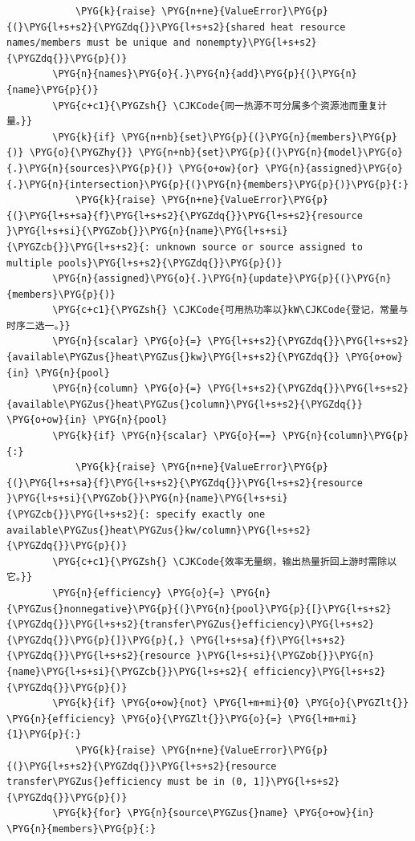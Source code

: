 \begin{Verbatim}
            \PYG{k}{raise} \PYG{n+ne}{ValueError}\PYG{p}{(}\PYG{l+s+s2}{\PYGZdq{}}\PYG{l+s+s2}{shared heat resource names/members must be unique and nonempty}\PYG{l+s+s2}{\PYGZdq{}}\PYG{p}{)}
        \PYG{n}{names}\PYG{o}{.}\PYG{n}{add}\PYG{p}{(}\PYG{n}{name}\PYG{p}{)}
        \PYG{c+c1}{\PYGZsh{} \CJKCode{同一热源不可分属多个资源池而重复计量。}}
        \PYG{k}{if} \PYG{n+nb}{set}\PYG{p}{(}\PYG{n}{members}\PYG{p}{)} \PYG{o}{\PYGZhy{}} \PYG{n+nb}{set}\PYG{p}{(}\PYG{n}{model}\PYG{o}{.}\PYG{n}{sources}\PYG{p}{)} \PYG{o+ow}{or} \PYG{n}{assigned}\PYG{o}{.}\PYG{n}{intersection}\PYG{p}{(}\PYG{n}{members}\PYG{p}{)}\PYG{p}{:}
            \PYG{k}{raise} \PYG{n+ne}{ValueError}\PYG{p}{(}\PYG{l+s+sa}{f}\PYG{l+s+s2}{\PYGZdq{}}\PYG{l+s+s2}{resource }\PYG{l+s+si}{\PYGZob{}}\PYG{n}{name}\PYG{l+s+si}{\PYGZcb{}}\PYG{l+s+s2}{: unknown source or source assigned to multiple pools}\PYG{l+s+s2}{\PYGZdq{}}\PYG{p}{)}
        \PYG{n}{assigned}\PYG{o}{.}\PYG{n}{update}\PYG{p}{(}\PYG{n}{members}\PYG{p}{)}
        \PYG{c+c1}{\PYGZsh{} \CJKCode{可用热功率以}kW\CJKCode{登记，常量与时序二选一。}}
        \PYG{n}{scalar} \PYG{o}{=} \PYG{l+s+s2}{\PYGZdq{}}\PYG{l+s+s2}{available\PYGZus{}heat\PYGZus{}kw}\PYG{l+s+s2}{\PYGZdq{}} \PYG{o+ow}{in} \PYG{n}{pool}
        \PYG{n}{column} \PYG{o}{=} \PYG{l+s+s2}{\PYGZdq{}}\PYG{l+s+s2}{available\PYGZus{}heat\PYGZus{}column}\PYG{l+s+s2}{\PYGZdq{}} \PYG{o+ow}{in} \PYG{n}{pool}
        \PYG{k}{if} \PYG{n}{scalar} \PYG{o}{==} \PYG{n}{column}\PYG{p}{:}
            \PYG{k}{raise} \PYG{n+ne}{ValueError}\PYG{p}{(}\PYG{l+s+sa}{f}\PYG{l+s+s2}{\PYGZdq{}}\PYG{l+s+s2}{resource }\PYG{l+s+si}{\PYGZob{}}\PYG{n}{name}\PYG{l+s+si}{\PYGZcb{}}\PYG{l+s+s2}{: specify exactly one available\PYGZus{}heat\PYGZus{}kw/column}\PYG{l+s+s2}{\PYGZdq{}}\PYG{p}{)}
        \PYG{c+c1}{\PYGZsh{} \CJKCode{效率无量纲，输出热量折回上游时需除以它。}}
        \PYG{n}{efficiency} \PYG{o}{=} \PYG{n}{\PYGZus{}nonnegative}\PYG{p}{(}\PYG{n}{pool}\PYG{p}{[}\PYG{l+s+s2}{\PYGZdq{}}\PYG{l+s+s2}{transfer\PYGZus{}efficiency}\PYG{l+s+s2}{\PYGZdq{}}\PYG{p}{]}\PYG{p}{,} \PYG{l+s+sa}{f}\PYG{l+s+s2}{\PYGZdq{}}\PYG{l+s+s2}{resource }\PYG{l+s+si}{\PYGZob{}}\PYG{n}{name}\PYG{l+s+si}{\PYGZcb{}}\PYG{l+s+s2}{ efficiency}\PYG{l+s+s2}{\PYGZdq{}}\PYG{p}{)}
        \PYG{k}{if} \PYG{o+ow}{not} \PYG{l+m+mi}{0} \PYG{o}{\PYGZlt{}} \PYG{n}{efficiency} \PYG{o}{\PYGZlt{}}\PYG{o}{=} \PYG{l+m+mi}{1}\PYG{p}{:}
            \PYG{k}{raise} \PYG{n+ne}{ValueError}\PYG{p}{(}\PYG{l+s+s2}{\PYGZdq{}}\PYG{l+s+s2}{resource transfer\PYGZus{}efficiency must be in (0, 1]}\PYG{l+s+s2}{\PYGZdq{}}\PYG{p}{)}
        \PYG{k}{for} \PYG{n}{source\PYGZus{}name} \PYG{o+ow}{in} \PYG{n}{members}\PYG{p}{:}

\end{Verbatim}
